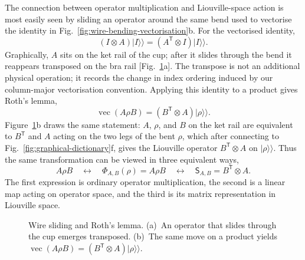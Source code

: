 The connection between operator multiplication and Liouville-space action is most easily seen by sliding an operator around the same bend used to vectorise the identity in Fig.~\ref{fig:wire-bending-vectorisation}b.
For the vectorised identity,
%
\begin{equation}
    (I\otimes A)\lvert I\rangle\!\rangle
    = (A^{\mathsf T}\otimes I)\lvert I\rangle\!\rangle.
    \label{eq:operator-sliding}
\end{equation}
%
Graphically, \(A\) sits on the ket rail of the cup; after it slides through the bend it reappears transposed on the bra rail [Fig.~\ref{fig:left-right-wire-sliding}a].
The transpose is not an additional physical operation; it records the change in index ordering induced by our column-major vectorisation convention.
Applying this identity to a product gives Roth's lemma,
%
\begin{equation}
    \operatorname{vec}(A\rho B)
    = (B^{\mathsf T}\otimes A) \lvert\rho\rangle\!\rangle.
    \label{eq:roth-lemma}
\end{equation}
%
Figure~\ref{fig:left-right-wire-sliding}b draws the same statement: \(A\), \(\rho\), and \(B\) on the ket rail are equivalent to \(B^{\mathsf T}\) and \(A\) acting on the two legs of the bent \(\rho\), which after connecting to Fig.~\ref{fig:graphical-dictionary}f, gives the Liouville operator \(B^{\mathsf T}\otimes A\) on \(\lvert\rho\rangle\!\rangle\).
Thus the same transformation can be viewed in three equivalent ways, \[
    A\rho B \quad\longleftrightarrow\quad \Phi_{A,B}(\rho)=A\rho B \quad\longleftrightarrow\quad \mathsf S_{A,B}=B^{\mathsf T}\otimes A.
\]
The first expression is ordinary operator multiplication, the second is a linear map acting on operator space, and the third is its matrix representation in Liouville space.
%
\begin{figure}[H]
    \centering
    
    \caption{Wire sliding and Roth's lemma.
    (a)~An operator that slides through the cup emerges transposed.
    (b)~The same move on a product yields \(\operatorname{vec}(A\rho B)=(B^{\mathsf T}\otimes A)\lvert\rho\rangle\!\rangle\).}
    \label{fig:left-right-wire-sliding}
\end{figure}
%

